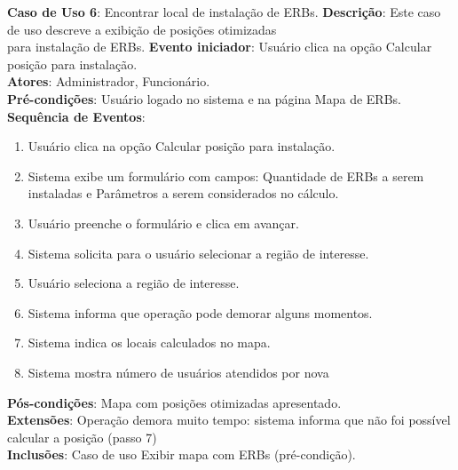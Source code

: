 \documentclass[]{politex}
\begin{document}
\noindent \textbf{Caso de Uso 6}: Encontrar local de instalação de ERBs.
\textbf{Descrição}: Este caso de uso descreve a exibição de posições otimizadas \\
para instalação de ERBs. 
\textbf{Evento iniciador}: Usuário clica na opção Calcular posição para instalação. \\
\textbf{Atores}: Administrador, Funcionário. \\
\textbf{Pré-condições}: Usuário logado no sistema e na página Mapa de ERBs. \\
\textbf{Sequência de Eventos}:
\begin{enumerate}
\item Usuário clica na opção Calcular posição para instalação.
\item Sistema exibe um formulário com campos: Quantidade de ERBs a serem
instaladas e Parâmetros a serem considerados no cálculo.
\item Usuário preenche o formulário e clica em avançar.
\item Sistema solicita para o usuário selecionar a região de interesse.
\item Usuário seleciona a região de interesse.
\item Sistema informa que operação pode demorar alguns momentos.
\item Sistema indica os locais calculados no mapa.
\item Sistema mostra número de usuários atendidos por nova 
\end{enumerate}
\textbf{Pós-condições}: Mapa com posições otimizadas apresentado. \\
\textbf{Extensões}: Operação demora muito tempo: sistema informa que não foi
possível calcular a posição (passo 7) \\
\textbf{Inclusões}: Caso de uso Exibir mapa com ERBs (pré-condição). \\
\end{document}
